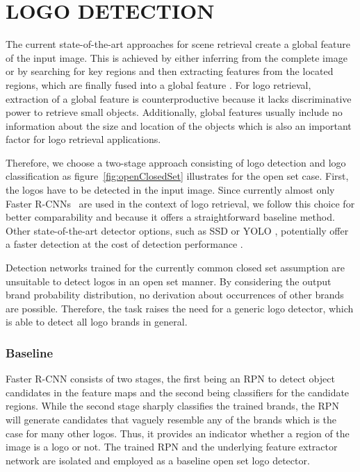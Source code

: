 \documentclass[a4paper,twoside]{article}
\begin{document}
\section{\uppercase{Logo Detection}}
\label{sec:detection}
\noindent The current state-of-the-art approaches for scene retrieval create a global feature of the input image. This is achieved by either inferring from the complete image or by searching for key regions and then extracting features from the located regions, which are finally fused into a global feature \cite{torii2015,arandjelovic2016,kalantidis2016}. For logo retrieval, extraction of a global feature is counterproductive because it lacks discriminative power to retrieve small objects. Additionally, global features usually include no information about the size and location of the objects which is also an important factor for logo retrieval applications.

Therefore, we choose a two-stage approach consisting of logo detection and logo classification as figure~\ref{fig:openClosedSet} illustrates for the open set case. First, the logos have to be detected in the input image. 
Since currently almost only Faster R-CNNs~\cite{ren2015} are used in the context of logo retrieval, we follow this choice for better comparability and because it offers a straightforward baseline method.
Other state-of-the-art detector options, such as SSD \cite{liu2016b} or YOLO \cite{redmon2016}, potentially offer a faster detection at the cost of detection performance \cite{huang2016b}.

Detection networks trained for the currently common closed set assumption are unsuitable to detect logos in an open set manner. By considering the output brand probability distribution, no derivation about occurrences of other brands are possible. Therefore, the task raises the need for a generic logo detector, which is able to detect all logo brands in general.

\subsubsection*{Baseline}
Faster R-CNN consists of two stages, the first being an \ac{RPN} to detect object candidates in the feature maps and the second being classifiers for the candidate regions. While the second stage sharply classifies the trained brands, the \ac{RPN} will generate candidates that vaguely resemble any of the brands which is the case for many other logos. Thus, it provides an indicator whether a region of the image is a logo or not. The trained \ac{RPN} and the underlying feature extractor network are isolated and employed as a baseline open set logo detector. 
\end{document}
